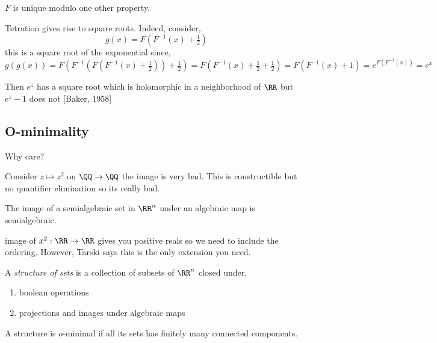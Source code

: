 \documentclass[12pt]{article}
\begin{document}
\begin{rmk}
$F$ is unique modulo one other property. 
\end{rmk}

Tetration gives rise to square roots. Indeed, consider,
\[ g(x) = F(F^{-1}(x) + \tfrac{1}{2}) \]
this is a square root of the exponential since,
\[ g(g(x)) = F(F^{-1}(F(F^{-1}(x) + \tfrac{1}{2})) + \tfrac{1}{2}) = F(F^{-1}(x) + \tfrac{1}{2} + \tfrac{1}{2}) = F(F^{-1}(x) + 1) = e^{F(F^{-1}(x))} = e^x \]


\begin{rmk}
Then $e^z$ has a square root which is holomorphic in a neighborhood of $\RR$ but $e^z - 1$ does not [Baker, 1958]
\end{rmk}

\subsection{O-minimality}

Why care? 

\begin{example}
Consider $z \mapsto z^2$ on $\QQ \to \QQ$ the image is very bad. This is constructible but no quantifier elimination so its really bad. 
\end{example}

\begin{theorem}[Tarski]
The image of a semialgebraic set in $\RR^n$ under an algebraic map is semialgebraic. 
\end{theorem}

\begin{rmk}
image of $x^2 : \RR \to \RR$ gives you positive reals so we need to include the ordering. However, Tarski says this is the only extension you need.
\end{rmk}

\begin{defn}
A \textit{structure of sets} is a collection of subsets of $\RR^n$ closed under,
\begin{enumerate}
\item boolean operations
\item projections and images under algebraic maps
\end{enumerate}
\end{defn}

\begin{defn}
A structure is $o$-minimal if all its sets has finitely many connected components.
\end{defn}
\end{document}
